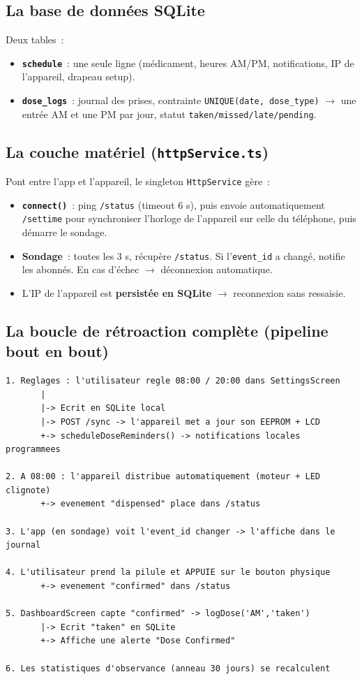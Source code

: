 \documentclass[11pt,a4paper]{article}
\begin{document}
\subsection{La base de donn\'ees SQLite}
Deux tables~:
\begin{itemize}
  \item \textbf{\texttt{schedule}}~: une seule ligne (m\'edicament, heures AM/PM,
        notifications, IP de l'appareil, drapeau setup).
  \item \textbf{\texttt{dose\_logs}}~: journal des prises, contrainte
        \texttt{UNIQUE(date, dose\_type)} $\rightarrow$ une entr\'ee AM et une PM par jour,
        statut \texttt{taken/missed/late/pending}.
\end{itemize}

\subsection{La couche mat\'eriel (\texttt{httpService.ts})}
Pont entre l'app et l'appareil, le singleton \texttt{HttpService} g\`ere~:
\begin{itemize}
  \item \textbf{\texttt{connect()}}~: ping \texttt{/status} (timeout 6 s), puis envoie
        automatiquement \texttt{/settime} pour synchroniser l'horloge de l'appareil sur
        celle du t\'el\'ephone, puis d\'emarre le sondage.
  \item \textbf{Sondage}~: toutes les 3 s, r\'ecup\`ere \texttt{/status}. Si l'\texttt{event\_id}
        a chang\'e, notifie les abonn\'es. En cas d'\'echec $\rightarrow$ d\'econnexion automatique.
  \item L'IP de l'appareil est \textbf{persist\'ee en SQLite} $\rightarrow$ reconnexion sans ressaisie.
\end{itemize}

\subsection{La boucle de r\'etroaction compl\`ete (pipeline bout en bout)}

\begin{lstlisting}
1. Reglages : l'utilisateur regle 08:00 / 20:00 dans SettingsScreen
       |
       |-> Ecrit en SQLite local
       |-> POST /sync -> l'appareil met a jour son EEPROM + LCD
       +-> scheduleDoseReminders() -> notifications locales programmees

2. A 08:00 : l'appareil distribue automatiquement (moteur + LED clignote)
       +-> evenement "dispensed" place dans /status

3. L'app (en sondage) voit l'event_id changer -> l'affiche dans le journal

4. L'utilisateur prend la pilule et APPUIE sur le bouton physique
       +-> evenement "confirmed" dans /status

5. DashboardScreen capte "confirmed" -> logDose('AM','taken')
       |-> Ecrit "taken" en SQLite
       +-> Affiche une alerte "Dose Confirmed"

6. Les statistiques d'observance (anneau 30 jours) se recalculent
\end{lstlisting}
\end{document}
